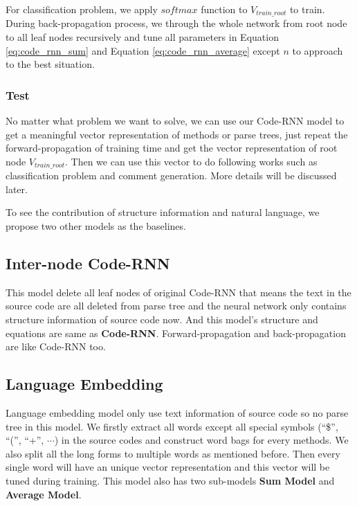 For classification problem, we apply $softmax$ function to $V_{train\_root}$ to train. During back-propagation process, we through the whole network from root node to all leaf nodes recursively and tune all parameters in Equation \ref{eq:code_rnn_sum} and Equation \ref{eq:code_rnn_average} except $n$ to approach to the best situation.

\subsubsection{Test}

No matter what problem we want to solve, we can use our Code-RNN model to get a meaningful vector representation of methods or parse trees, just repeat the forward-propagation of training time and get the vector representation of root node $V_{train\_root}$. Then we can use this vector to do following works such as classification problem and comment generation. More details will be discussed later.

To see the contribution of structure information and natural language, 
we propose two other models as the baselines. 

\subsection{Inter-node Code-RNN}

This model delete all leaf nodes of original Code-RNN that means the text in the source code are all deleted from parse tree and the neural network only contains structure information of source code now. And this model's structure and equations are same as \textbf{Code-RNN}. Forward-propagation and back-propagation are like Code-RNN too.

\subsection{Language Embedding}

Language embedding model only use text information of source code so no parse tree in this model. We firstly extract all words except all special symbols (``\$'', ``('', ``+'', $\cdots$) in the source codes and construct word bags for every methods. We also split all the long forms to multiple words as mentioned before. Then every single word will have an unique vector representation and this vector will be tuned during training. This model also has two sub-models \textbf{Sum Model} and \textbf{Average Model}.

